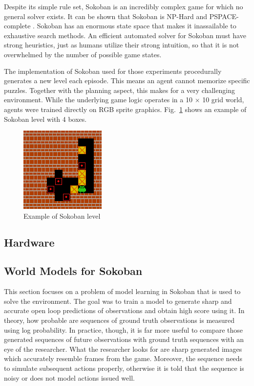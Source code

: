 Despite its simple rule set, Sokoban is an incredibly complex game for which no general solver exists. It can be shown that Sokoban is NP-Hard and PSPACE-complete \cite{Benchmark.Sokoban}. Sokoban has an enormous state space that makes it inassailable to exhaustive search methods. An efficient automated solver for Sokoban must have strong heuristics, just as humans utilize their strong intuition, so that it is not overwhelmed by the number of possible game states.

The implementation of Sokoban\cite{Code.Sokoban} used for those experiments procedurally generates a new level each episode. This means an agent cannot memorize specific puzzles. Together with the planning aspect, this makes for a very challenging environment. While the underlying game logic operates in a 10 × 10 grid world, agents were trained directly on RGB sprite graphics. Fig.~\ref{Fig.Sokoban} shows an example of Sokoban level with 4 boxes.


\begin{figure}[H]
\includegraphics[]{figures/Sokoban.png}
\caption[Sokoban]{Example of Sokoban level}
\label{Fig.Sokoban}
\end{figure}

\subsection{Hardware}


\subsection{World Models for Sokoban}

This section focuses on a problem of model learning in Sokoban that is used to solve the environment. The goal was to train a model to generate sharp and accurate open loop predictions of observations and obtain high score using it. In theory, how probable are sequences of ground truth observations is measured using log probability. In practice, though, it is far more useful to compare those generated sequences of future observations with ground truth sequences with an eye of the researcher. What the researcher looks for are sharp generated images which accurately resemble frames from the game. Moreover, the sequence needs to simulate subsequent actions properly, otherwise it is told that the sequence is noisy or does not model actions issued well.

